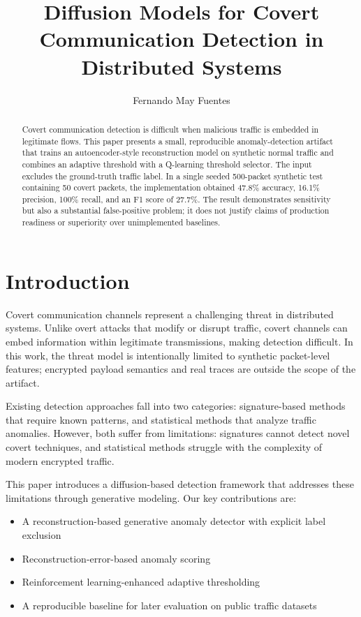 \documentclass[sigconf]{acmart}
\title{Diffusion Models for Covert Communication Detection in Distributed Systems}
\author{Fernando May Fuentes}
\affiliation{
  \institution{Instituto Polit\'{e}cnico Nacional}
  \city{Ciudad de M\'{e}xico}
  \country{M\'{e}xico}
}
\begin{document}
\begin{abstract}
Covert communication detection is difficult when malicious traffic is embedded in legitimate flows. This paper presents a small, reproducible anomaly-detection artifact that trains an autoencoder-style reconstruction model on synthetic normal traffic and combines an adaptive threshold with a Q-learning threshold selector. The input excludes the ground-truth traffic label. In a single seeded 500-packet synthetic test containing 50 covert packets, the implementation obtained 47.8\% accuracy, 16.1\% precision, 100\% recall, and an F1 score of 27.7\%. The result demonstrates sensitivity but also a substantial false-positive problem; it does not justify claims of production readiness or superiority over unimplemented baselines.
\end{abstract}


\maketitle

\section{Introduction}

Covert communication channels represent a challenging threat in distributed systems. Unlike overt attacks that modify or disrupt traffic, covert channels can embed information within legitimate transmissions, making detection difficult. In this work, the threat model is intentionally limited to synthetic packet-level features; encrypted payload semantics and real traces are outside the scope of the artifact.

Existing detection approaches fall into two categories: signature-based methods that require known patterns, and statistical methods that analyze traffic anomalies. However, both suffer from limitations: signatures cannot detect novel covert techniques, and statistical methods struggle with the complexity of modern encrypted traffic.

This paper introduces a diffusion-based detection framework that addresses these limitations through generative modeling. Our key contributions are:

\begin{itemize}
\item A reconstruction-based generative anomaly detector with explicit label exclusion
\item Reconstruction-error-based anomaly scoring
\item Reinforcement learning-enhanced adaptive thresholding
\item A reproducible baseline for later evaluation on public traffic datasets
\end{itemize}
\end{document}
